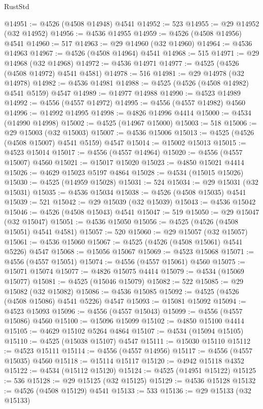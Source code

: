 \begin{lexlean}{RustStd}
\begin{coremodule}
{\begin{coremodule}
{{{{{{{{{{{{{{{{{{{{{{{{{{{{{{{{{{{{{{{{{{{{{{{{{{{{{{{@14951 := @4526 (@4508 @14948) @4541
@14952 := 523
@14955 := @29 @14952 (@32 @14952)
@14956 := @4536 @14955
@14959 := @4526 (@4508 @14956) @4541
@14960 := 517
@14963 := @29 @14960 (@32 @14960)
@14964 := @4536 @14963
@14967 := @4526 (@4508 @14964) @4541
@14968 := 515
@14971 := @29 @14968 (@32 @14968)
@14972 := @4536 @14971
@14977 := @4525 (@4526 (@4508 @14972) @4541 @4581)
@14978 := 516
@14981 := @29 @14978 (@32 @14978)
@14982 := @4536 @14981
@14988 := @4525 (@4526 (@4508 @14982) @4541 @5159) @4547
@14989 := @14977 @14988
@14990 := @4523 @14989
@14992 := @4556 (@4557 @14972)
@14995 := @4556 (@4557 @14982) @4560
@14996 := @14992 @14995
@14998 := @4826 @14996 @4414
@15000 := @4534 (@14990 @14998)
@15002 := @4525 (@14967 @15000)
@15003 := 518
@15006 := @29 @15003 (@32 @15003)
@15007 := @4536 @15006
@15013 := @4525 (@4526 (@4508 @15007) @4541 @5159) @4547
@15014 := @15002 @15013
@15015 := @4523 @15014
@15017 := @4556 (@4557 @14964)
@15020 := @4556 (@4557 @15007) @4560
@15021 := @15017 @15020
@15023 := @4850 @15021 @4414
@15026 := @4629 @15023 @5197 @4864
@15028 := @4534 (@15015 @15026)
@15030 := @4525 (@14959 @15028)
@15031 := 524
@15034 := @29 @15031 (@32 @15031)
@15035 := @4536 @15034
@15038 := @4526 (@4508 @15035) @4541
@15039 := 521
@15042 := @29 @15039 (@32 @15039)
@15043 := @4536 @15042
@15046 := @4526 (@4508 @15043) @4541
@15047 := 519
@15050 := @29 @15047 (@32 @15047)
@15051 := @4536 @15050
@15056 := @4525 (@4526 (@4508 @15051) @4541 @4581)
@15057 := 520
@15060 := @29 @15057 (@32 @15057)
@15061 := @4536 @15060
@15067 := @4525 (@4526 (@4508 @15061) @4541 @5226) @4547
@15068 := @15056 @15067
@15069 := @4523 @15068
@15071 := @4556 (@4557 @15051)
@15074 := @4556 (@4557 @15061) @4560
@15075 := @15071 @15074
@15077 := @4826 @15075 @4414
@15079 := @4534 (@15069 @15077)
@15081 := @4525 (@15046 @15079)
@15082 := 522
@15085 := @29 @15082 (@32 @15082)
@15086 := @4536 @15085
@15092 := @4525 (@4526 (@4508 @15086) @4541 @5226) @4547
@15093 := @15081 @15092
@15094 := @4523 @15093
@15096 := @4556 (@4557 @15043)
@15099 := @4556 (@4557 @15086) @4560
@15100 := @15096 @15099
@15102 := @4850 @15100 @4414
@15105 := @4629 @15102 @5264 @4864
@15107 := @4534 (@15094 @15105)
@15110 := @4525 (@15038 @15107) @4547
@15111 := @15030 @15110
@15112 := @4523 @15111
@15114 := @4556 (@4557 @14956)
@15117 := @4556 (@4557 @15035) @4560
@15118 := @15114 @15117
@15120 := @4942 @15118 @4352
@15122 := @4534 (@15112 @15120)
@15124 := @4525 (@14951 @15122)
@15125 := 536
@15128 := @29 @15125 (@32 @15125)
@15129 := @4536 @15128
@15132 := @4526 (@4508 @15129) @4541
@15133 := 533
@15136 := @29 @15133 (@32 @15133)
}}}}}}}}}}}}}}}}}}}}}}}}}}}}}}}}}}}}}}}}}}}}}}}}}}}}}}}
\end{coremodule}}
\end{coremodule}
\end{lexlean}
